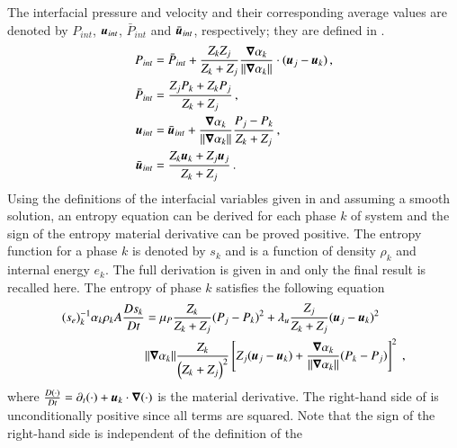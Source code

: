 \documentclass[preprint,10pt]{elsarticle}
\begin{document}
 
The interfacial pressure and velocity and their corresponding average values are denoted by $P_{int}$, $\boldsymbol u_{int}$, 
$\bar{P}_{int}$ and $\bar{\boldsymbol u}_{int}$, respectively; they are defined in .
%
\begin{subequations}
\label{eq:int_variables_def}
\begin{align}
  \label{E-R:83}
  P_{int} &= \bar{P}_{int} + \frac{Z_{k}Z_{j}}{Z_{k}+Z_{j}} \frac{\boldsymbol\nabla \alpha_{k}}{|| \boldsymbol\nabla \alpha_{k} ||} \cdot (\boldsymbol u_{j}-\boldsymbol u_{k}) \,,
  \\
  \bar{P}_{int} &= \frac{Z_{j}P_{k}+Z_{k}P_{j}}{Z_{k}+Z_{j}} \,,
 \\
  \label{E-R:84}
  \boldsymbol u_{int} &= \bar{\boldsymbol u}_{int} +  \frac{\boldsymbol\nabla \alpha_{k}}{|| \boldsymbol\nabla \alpha_{k} ||} \frac{P_{j}-P_{k}}{Z_{k}+Z_{j}} \,,
  \\
  \bar{\boldsymbol u}_{int} &= \frac{Z_{k} \boldsymbol u_{k}+Z_{j}\boldsymbol u_{j}}{Z_{k}+Z_{j}} \,.
\end{align}
\end{subequations}
%
Using the definitions of the interfacial variables given in  and assuming a smooth solution, an entropy equation can be 
derived for each phase $k$ of system  and the sign of the entropy material derivative can be proved positive. 
The entropy function for a phase $k$ is denoted by $s_k$ and is a function of 
density $\rho_k$ and internal energy $e_k$. The full derivation is given in \cite{Marco_paper_sem} and only the final result is recalled here. 
The entropy of phase $k$ satisfies the following equation
%
\begin{align} \label{eq:ent-eqn-7-eqn}
(s_{e})_k^{-1} \alpha_k \rho_k A \frac{Ds_k}{Dt} &= \mu_P \frac{Z_k}{Z_k+Z_j} (P_j - P_k)^2 + \lambda_u \frac{Z_j}{Z_k+Z_j} (\boldsymbol u_j -\boldsymbol u_k)^2 
\nonumber
\\
& \| \boldsymbol\nabla \alpha_k \| \frac{Z_k}{\left( Z_k+Z_j \right)^2} \left[ Z_j (\boldsymbol u_j-\boldsymbol u_k)+\frac{\boldsymbol\nabla \alpha_k}{\| \boldsymbol\nabla \alpha_k \|}(P_k-P_j)\right]^2 \ ,
\end{align}
%
where $\frac{D(\cdot) }{Dt} = \partial_t (\cdot) + \boldsymbol u_k \cdot \boldsymbol\nabla (\cdot)$ is the material derivative.
The right-hand side of  is unconditionally positive since all terms are squared. Note that the sign of the right-hand side is independent of 
the definition of the 
\end{document}
